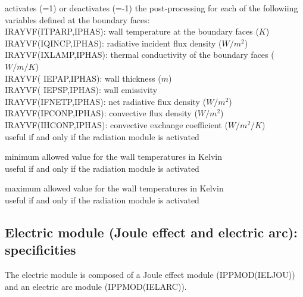 {activates (=1) or deactivates (=-1) the post-processing for each of the
followiing variables defined at the boundary faces:\\
\hspace*{1.3cm} IRAYVF(ITPARP,IPHAS): wall temperature at the boundary
faces ($K$)\\
\hspace*{1.3cm} IRAYVF(IQINCP,IPHAS): radiative incident flux density
($W/m^2$)\\
\hspace*{1.3cm} IRAYVF(IXLAMP,IPHAS): thermal conductivity of the
boundary faces ($W/m/K$)\\
\hspace*{1.3cm} IRAYVF( IEPAP,IPHAS): wall thickness ($m$)\\
\hspace*{1.3cm} IRAYVF( IEPSP,IPHAS): wall emissivity \\
\hspace*{1.3cm} IRAYVF(IFNETP,IPHAS): net radiative flux density ($W/m^2$)\\
\hspace*{1.3cm} IRAYVF(IFCONP,IPHAS): convective flux density ($W/m^2$)\\
\hspace*{1.3cm} IRAYVF(IHCONP,IPHAS): convective exchange coefficient
($W/m^2/K$)\\
useful if and only if the radiation module is activated}

{minimum allowed value for the wall temperatures in Kelvin\\
useful if and only if the radiation module is activated}

{maximum allowed value for the wall temperatures in Kelvin\\
useful if and only if the radiation module is activated}

\subsection{Electric module (Joule effect and electric arc): specificities}

The electric module is composed of a Joule effect module
(IPPMOD(IELJOU)) and an electric arc module
(IPPMOD(IELARC)).

